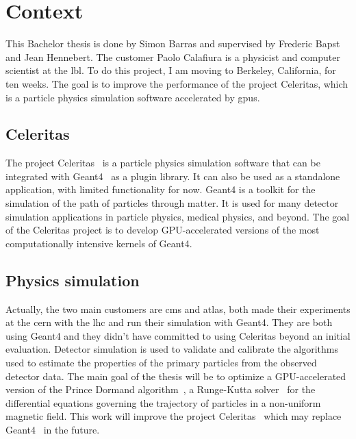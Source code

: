 \chapter{Context}
\label{spec:ch:context}

This Bachelor thesis is done by Simon Barras and supervised by Frederic Bapst and Jean Hennebert.
The customer Paolo Calafiura is a physicist and computer scientist at the \acrfull{lbl}.
To do this project, I am moving to Berkeley, California, for ten weeks.
The goal is to improve the performance of the project Celeritas, which is a particle physics simulation software accelerated by \acrshort{gpu}s.




\section{Celeritas}
\label{spec:ch:context:celeritas}

The project Celeritas~\cite{Celeritas-Project} is a particle physics simulation software that can be integrated with Geant4~\cite{geant4} as a plugin library.
It can also be used as a standalone application, with limited functionality for now.
Geant4 is a toolkit for the simulation of the path of particles through matter.
It is used for many detector simulation applications in particle physics, medical physics, and beyond.
The goal of the Celeritas project is to develop GPU-accelerated versions of the most computationally intensive kernels of Geant4.

\section{Physics simulation}
\label{spec:ch:context:physics-simulation}

Actually, the two main customers are \acrshort{cms} and \acrshort{atlas}, both made their experiments at the \acrfull{cern} with the \acrfull{lhc} and run their simulation with Geant4.
They are both using Geant4 and they didn't have committed to using Celeritas beyond an initial evaluation.
Detector simulation is used to validate and calibrate the algorithms used to estimate the properties of the primary particles from the observed detector data.
The main goal of the thesis will be to optimize a GPU-accelerated version of the Prince Dormand algorithm~\cite{princeDormand}, a Runge-Kutta solver~\cite{Runge-Kutta-methods} for the differential equations governing the trajectory of particles in a non-uniform magnetic field.
This work will improve the project Celeritas~\cite{Celeritas-Project} which may replace Geant4~\cite{geant4} in the future.

